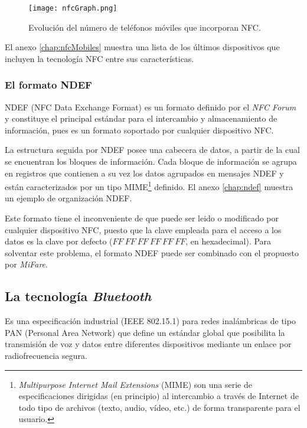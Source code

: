   \begin{figure}[!h]
    \begin{center}
      \texttt{[image: nfcGraph.png]}
      \caption{Evolución del número de teléfonos móviles que
      incorporan \acs{NFC}.}
      \label{fig:nfcGraph}
    \end{center}
  \end{figure}

El anexo \ref{chap:nfcMobiles} muestra una lista de los últimos dispositivos
que incluyen la tecnología \acs{NFC} entre sus características.

  \subsubsection{El formato \acs{NDEF}}
\acs{NDEF} (\acs{NFC} Data Exchange Format) es un formato definido por el
\emph{NFC Forum} y constituye el principal estándar para el intercambio y
almacenamiento de información, pues es un formato soportado por cualquier 
dispositivo \acs{NFC}.

La estructura seguida por \acs{NDEF} posee una cabecera de datos, a partir de
la cual se encuentran los bloques de información. Cada bloque de información
se agrupa en registros que contienen a su vez los datos agrupados en mensajes
\acs{NDEF} y están caracterizados por un tipo \acs{MIME}\footnote{
\emph{Multipurpose Internet Mail Extensions} (\acs{MIME}) son una serie
de especificaciones dirigidas (en principio) al intercambio a través de
Internet de todo tipo de archivos (texto, audio, vídeo, etc.) de forma
transparente para el usuario.} definido. El
anexo \ref{chap:ndef} muestra un ejemplo de organización \acs{NDEF}.

Este formato tiene el inconveniente de que puede ser leido o modificado por
cualquier dispositivo \acs{NFC}, puesto que la clave empleada para el acceso
a los datos es la clave por defecto ($FF\ FF\ FF\ FF\ FF\ FF$, en hexadecimal).
Para solventar este problema, el formato \acs{NDEF} puede ser combinado con
el propuesto por \emph{MiFare}.

  \subsection{La tecnología \emph{Bluetooth}}
Es una especificación industrial (\acs{IEEE} 802.15.1) para redes inalámbricas
de tipo \acs{PAN} (Personal Area Network) que define un estándar global que
posibilita la transmisión de voz y datos entre diferentes dispositivos mediante
un enlace por radiofrecuencia segura.

